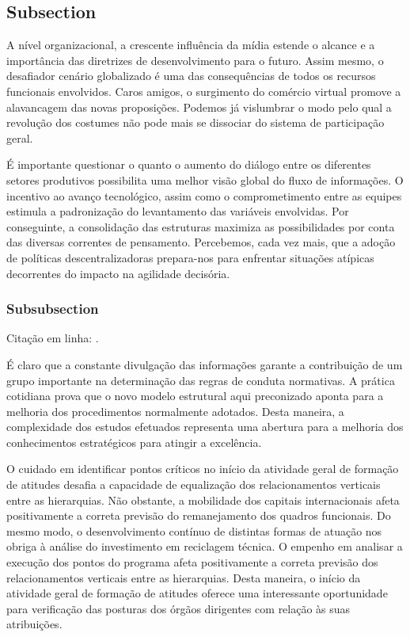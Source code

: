 \documentclass[a4paper,12pt]{udesc}
\begin{document}
\subsection{Subsection}

          A nível organizacional, a crescente influência da mídia estende o alcance e a importância das diretrizes de desenvolvimento para o futuro. Assim mesmo, o desafiador cenário globalizado é uma das consequências de todos os recursos funcionais envolvidos. Caros amigos, o surgimento do comércio virtual promove a alavancagem das novas proposições. Podemos já vislumbrar o modo pelo qual a revolução dos costumes não pode mais se dissociar do sistema de participação geral. 

          É importante questionar o quanto o aumento do diálogo entre os diferentes setores produtivos possibilita uma melhor visão global do fluxo de informações. O incentivo ao avanço tecnológico, assim como o comprometimento entre as equipes estimula a padronização do levantamento das variáveis envolvidas. Por conseguinte, a consolidação das estruturas maximiza as possibilidades por conta das diversas correntes de pensamento. Percebemos, cada vez mais, que a adoção de políticas descentralizadoras prepara-nos para enfrentar situações atípicas decorrentes do impacto na agilidade decisória. 

\subsubsection{Subsubsection}

Citação em linha: .

\cite{MQ04}
\cite{lopes2012dissertacao}
\cite{CL89}

          É claro que a constante divulgação das informações garante a contribuição de um grupo importante na determinação das regras de conduta normativas. A prática cotidiana prova que o novo modelo estrutural aqui preconizado aponta para a melhoria dos procedimentos normalmente adotados. Desta maneira, a complexidade dos estudos efetuados representa uma abertura para a melhoria dos conhecimentos estratégicos para atingir a excelência. 

          O cuidado em identificar pontos críticos no início da atividade geral de formação de atitudes desafia a capacidade de equalização dos relacionamentos verticais entre as hierarquias. Não obstante, a mobilidade dos capitais internacionais afeta positivamente a correta previsão do remanejamento dos quadros funcionais. Do mesmo modo, o desenvolvimento contínuo de distintas formas de atuação nos obriga à análise do investimento em reciclagem técnica. O empenho em analisar a execução dos pontos do programa afeta positivamente a correta previsão dos relacionamentos verticais entre as hierarquias. Desta maneira, o início da atividade geral de formação de atitudes oferece uma interessante oportunidade para verificação das posturas dos órgãos dirigentes com relação às suas atribuições.
\end{document}
